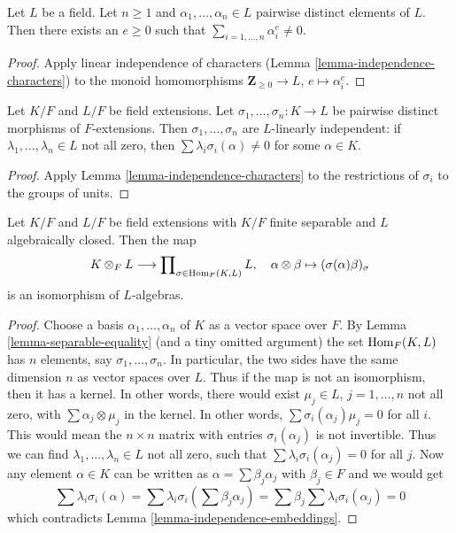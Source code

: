\begin{lemma}
\label{lemma-sums-of-powers}
Let $L$ be a field. Let $n \geq 1$ and $\alpha_1, \ldots, \alpha_n \in L$
pairwise distinct elements of $L$. Then there exists an
$e \geq 0$ such that $\sum_{i = 1, \ldots, n} \alpha_i^e \not = 0$.
\end{lemma}

\begin{proof}
Apply linear independence of characters
(Lemma \ref{lemma-independence-characters})
to the monoid homomorphisms $\mathbf{Z}_{\geq 0} \to L$,
$e \mapsto \alpha_i^e$.
\end{proof}

\begin{lemma}
\label{lemma-independence-embeddings}
Let $K/F$ and $L/F$ be field extensions. Let
$\sigma_1, \ldots, \sigma_n : K \to L$ be pairwise distinct
morphisms of $F$-extensions. Then $\sigma_1, \ldots, \sigma_n$
are $L$-linearly independent: if $\lambda_1, \ldots, \lambda_n \in L$
not all zero, then $\sum \lambda_i\sigma_i(\alpha) \not = 0$
for some $\alpha \in K$.
\end{lemma}

\begin{proof}
Apply Lemma \ref{lemma-independence-characters} to
the restrictions of $\sigma_i$ to the groups of units.
\end{proof}

\begin{lemma}
\label{lemma-finite-separable-tensor-alg-closed}
Let $K/F$ and $L/F$ be field extensions with
$K/F$ finite separable and $L$ algebraically closed.
Then the map
$$
K \otimes_F L
\longrightarrow
\prod\nolimits_{\sigma \in \mathop{\mathrm{Hom}}\nolimits_F(K, L)} L,\quad
\alpha \otimes \beta \mapsto (\sigma(\alpha)\beta)_\sigma
$$
is an isomorphism of $L$-algebras.
\end{lemma}

\begin{proof}
Choose a basis $\alpha_1, \ldots, \alpha_n$ of $K$ as a vector space over $F$.
By Lemma \ref{lemma-separable-equality} (and a tiny omitted argument) the set
$\mathop{\mathrm{Hom}}\nolimits_F(K, L)$ has $n$ elements, say $\sigma_1, \ldots, \sigma_n$.
In particular, the two sides have the same dimension $n$ as vector
spaces over $L$. Thus if the map is not an isomorphism, then it
has a kernel. In other words, there would exist
$\mu_j \in L$, $j = 1, \ldots, n$ not all zero,
with $\sum \alpha_j \otimes \mu_j$ in the kernel.
In other words, $\sum \sigma_i(\alpha_j)\mu_j = 0$ for all $i$.
This would mean the $n \times n$ matrix with entries
$\sigma_i(\alpha_j)$ is not invertible. Thus we can find
$\lambda_1, \ldots, \lambda_n \in L$ not all zero,
such that $\sum \lambda_i\sigma_i(\alpha_j) = 0$ for all $j$.
Now any element $\alpha \in K$ can be written as
$\alpha = \sum \beta_j \alpha_j$ with $\beta_j \in F$ and we would get
$$
\sum \lambda_i\sigma_i(\alpha) =
\sum \lambda_i\sigma_i(\sum \beta_j \alpha_j) =
\sum \beta_j \sum \lambda_i\sigma_i(\alpha_j) = 0
$$
which contradicts Lemma \ref{lemma-independence-embeddings}.
\end{proof}







